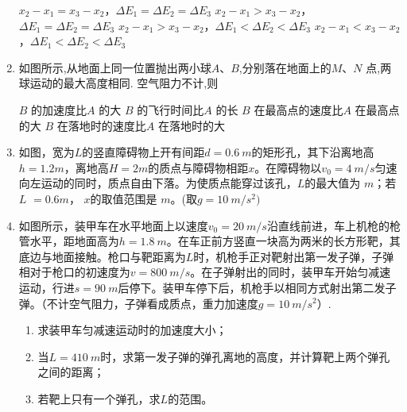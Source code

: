 \begin{enumerate}[leftmargin=0em]
\fourchoices
{$ x_{2} - x_{1} =x_3- x_{2} $，$ \Delta E_{1} = \Delta E_{2} = \Delta E_3 $}
{$ x_{2} - x_{1} >x_3- x_{2} $，$ \Delta E_{1} = \Delta E_{2} = \Delta E_3 $}
{$ x_{2} - x_{1} >x_3- x_{2} $，$ \Delta E_{1} < \Delta E_{2} < \Delta E_3 $}
{$ x_{2} - x_{1} <x_3- x_{2} $，$ \Delta E_{1} < \Delta E_{2} < \Delta E_3 $}



\item 
{}
如图所示,从地面上同一位置抛出两小球$ A $、$ B $,分别落在地面上的$ M $、$ N $ 点,两球运动的最大高度相同. 空气阻力不计,则  
\begin{figure}[h!]
\centering

\end{figure}





\fourchoices
{$ B $ 的加速度比$ A $ 的大}
{$ B $ 的飞行时间比$ A $ 的长}
{$ B $ 在最高点的速度比$ A $ 在最高点的大}
{$ B $ 在落地时的速度比$ A $ 在落地时的大}


\item 
{}
如图，宽为$ L $的竖直障碍物上开有间距$ d=0.6\ m $的矩形孔，其下沿离地高$ h=1.2m $，离地高$ H=2m $的质点与障碍物相距$ x $。在障碍物以$ v_{0} =4 \ m/s $匀速向左运动的同时，质点自由下落。为使质点能穿过该孔，$ L $的最大值为  $ m $；若$ L $ $ =0.6m $， $ x $的取值范围是  $ m $。(取$ g=10 \ m/s^{2} ) $
\begin{figure}[h!]
\centering

\end{figure}



\item 
{}
如图所示，装甲车在水平地面上以速度$ v_{0} =20 \ m/s $沿直线前进，车上机枪的枪管水平，距地面高为$ h=1.8\ m $。在车正前方竖直一块高为两米的长方形靶，其底边与地面接触。枪口与靶距离为$ L $时，机枪手正对靶射出第一发子弹，子弹相对于枪口的初速度为$ v=800 \ m/s $。在子弹射出的同时，装甲车开始匀减速运动，行进$ s=90\ m $后停下。装甲车停下后，机枪手以相同方式射出第二发子弹。（不计空气阻力，子弹看成质点，重力加速度$ g=10 \ m/s^{2} $）.
\begin{enumerate}
\renewcommand{\labelenumi}{\arabic{enumi}.}
\item
求装甲车匀减速运动时的加速度大小；
\item 
当$ L=410\ m $时，求第一发子弹的弹孔离地的高度，并计算靶上两个弹孔之间的距离；
\item 
若靶上只有一个弹孔，求$ L $的范围。


\end{enumerate}
\end{enumerate}
